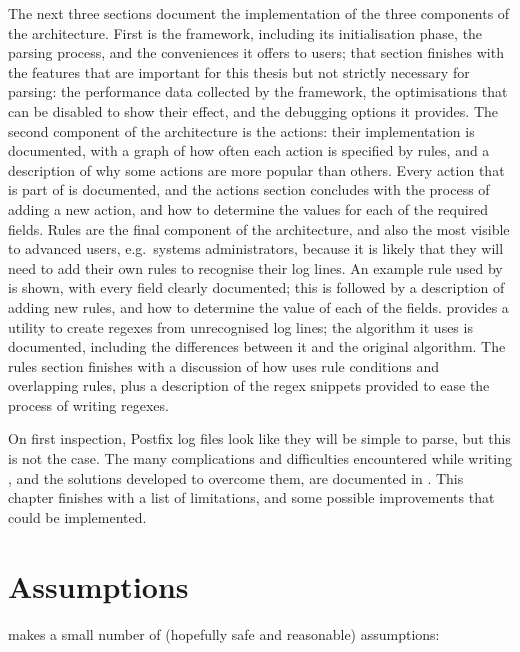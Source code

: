 The next three sections document the implementation of the three components
of the architecture.  First is the framework, including its initialisation
phase, the parsing process, and the conveniences it offers to users; that
section finishes with the features that are important for this thesis but
not strictly necessary for parsing: the performance data collected by the
framework, the optimisations that can be disabled to show their effect, and
the debugging options it provides.  The second component of the
architecture is the actions: their implementation is documented, with a
graph of how often each action is specified by rules, and a description of
why some actions are more popular than others.  Every action that is part
of \parsername{} is documented, and the actions section concludes with the
process of adding a new action, and how to determine the values for each of
the required fields.  Rules are the final component of the architecture,
and also the most visible to advanced users, e.g.\ systems administrators,
because it is likely that they will need to add their own rules to
recognise their log lines.  An example rule used by \parsername{} is shown,
with every field clearly documented; this is followed by a description of
adding new rules, and how to determine the value of each of the fields.
\parsername{} provides a utility to create regexes from unrecognised log
lines; the algorithm it uses is documented, including the differences
between it and the original algorithm.  The rules section finishes with a
discussion of how \parsername{} uses rule conditions and overlapping rules,
plus a description of the regex snippets provided to ease the process of
writing regexes.

On first inspection, Postfix log files look like they will be simple to
parse, but this is not the case.  The many complications and difficulties
encountered while writing \parsername{}, and the solutions developed to
overcome them, are documented in .  This chapter
finishes with a list of \parsernames{} limitations, and some possible
improvements that could be implemented.

\section{Assumptions}

\parsername{} makes a small number of (hopefully safe and reasonable)
assumptions:

